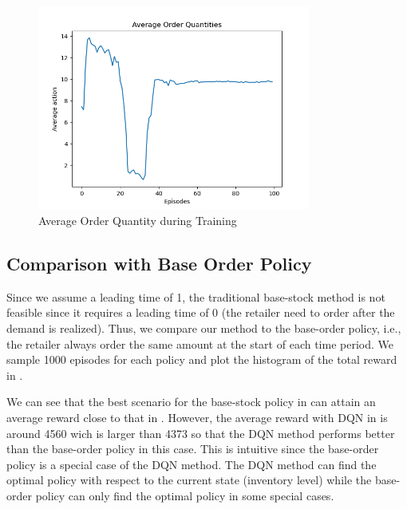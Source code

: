 \begin{figure}[H]
    \centering
    \includegraphics[width=0.8\textwidth]{figure/Average Order Quantities copy.png}
    \caption{Average Order Quantity during Training}
    \label{fig:avg-order-quantity}
\end{figure}

\subsection{Comparison with Base Order Policy}
Since we assume a leading time of 1, the traditional base-stock method is not feasible since it requires a leading time of 0 (the retailer need to order after the demand is realized). Thus, we compare our method to the base-order policy, i.e., the retailer always order the same amount at the start of each time period. We sample 1000 episodes for each policy and plot the histogram of the total reward in . 

We can see that the best scenario for the base-stock policy in  can attain an average reward close to that in . However, the average reward with DQN in  is around 4560 wich is larger than 4373 so that the DQN method performs better than the base-order policy in this case. This is intuitive since the base-order policy is a special case of the DQN method. The DQN method can find the optimal policy with respect to the current state (inventory level) while the base-order policy can only find the optimal policy in some special cases.

